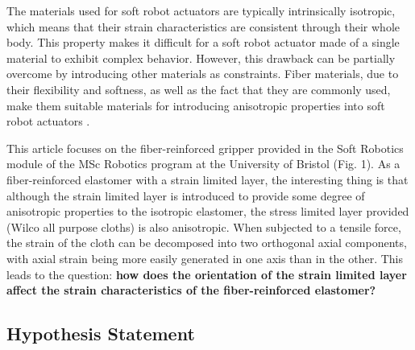 \documentclass[conference]{IEEEtran}
\begin{document}
The materials used for soft robot actuators are typically intrinsically isotropic, which means that their strain characteristics are consistent through their whole body. This property makes it difficult for a soft robot actuator made of a single material to exhibit complex behavior. However, this drawback can be partially overcome by introducing other materials as constraints. Fiber materials, due to their flexibility and softness, as well as the fact that they are commonly used, make them suitable materials for introducing anisotropic properties into soft robot actuators \cite{overview}.



This article focuses on the fiber-reinforced gripper provided in the Soft Robotics module of the MSc Robotics program at the University of Bristol (Fig. 1). As a fiber-reinforced elastomer with a strain limited layer\cite{stress_constraint_layer}, the interesting thing is that although the strain limited layer is introduced to provide some degree of anisotropic properties to the isotropic elastomer, the stress limited layer provided (Wilco all purpose cloths) is also anisotropic. When subjected to a tensile force, the strain of the cloth can be decomposed into two orthogonal axial components, with axial strain being more easily generated in one axis than in the other. This leads to the question: \textbf{how does the orientation of the strain limited layer affect the strain characteristics of the fiber-reinforced elastomer?}





\subsection{Hypothesis Statement}
\label{Hypothesis}

\end{document}
